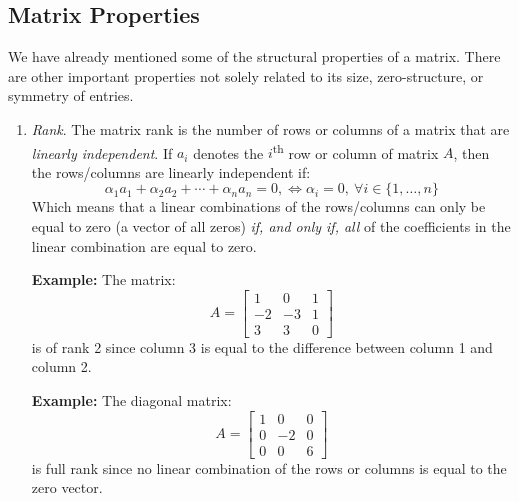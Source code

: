 \subsection{Matrix Properties}
We have already mentioned some of the structural properties of a matrix.  There are other important properties not solely related to its size, zero-structure, or symmetry of entries.

\begin{enumerate}
\item \emph{Rank}.  The matrix rank is the number of rows or columns of a matrix that are \emph{linearly independent}.  If $a_{i}$ denotes the $i$\textsuperscript{th} row or column of matrix $A$, then the rows/columns are linearly independent if:
\begin{equation*}
\alpha_1 a_1 + \alpha_2 a_2 + \cdots + \alpha_n a_n = 0, \iff \alpha_i = 0, \ \forall i \in \{1,\dots,n\}
\end{equation*}
Which means that a linear combinations of the rows/columns can only be equal to zero (a vector of all zeros) \emph{if, and only if, all} of the coefficients in the linear combination are equal to zero.  

\vspace{0.1cm}

\noindent\textbf{Example:} The matrix:
\begin{equation*}
A = \left[
\begin{matrix}
1 & 0 & 1 \\
-2 & -3 & 1 \\
3 & 3 & 0
\end{matrix}
\right]
\end{equation*}
is of rank 2 since column 3 is equal to the difference between column 1 and column 2.

\vspace{0.1cm}

\noindent\textbf{Example:} The diagonal matrix:
\begin{equation*}
A = \left[
\begin{matrix}
1 & 0 & 0 \\
0 & -2 & 0 \\
0 & 0 & 6
\end{matrix}
\right]
\end{equation*}
is full rank since no linear combination of the rows or columns is equal to the zero vector.


\end{enumerate}
